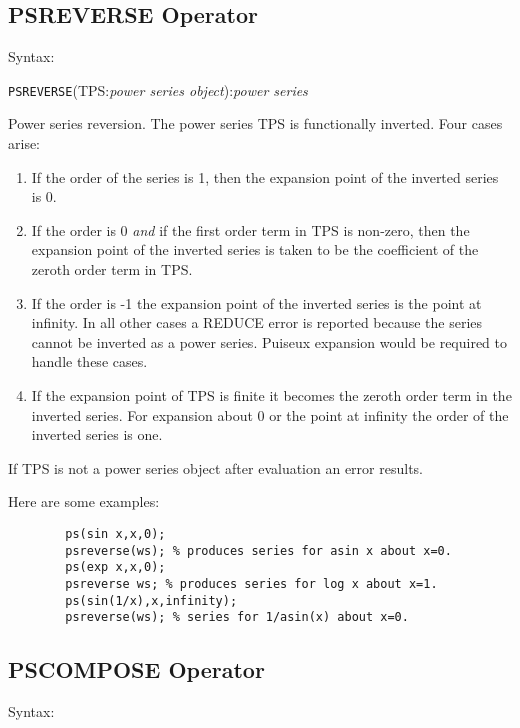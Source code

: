 \subsection{PSREVERSE Operator}

Syntax:

\hspace*{2em}
{\tt PSREVERSE}(TPS:{\em power series object}):{\em power series}

Power series reversion.  The power series TPS is functionally
inverted.  Four cases arise:

\begin{enumerate}
\item If the order of the series is 1, then the expansion point of the
inverted series is 0. 

\item If the order is 0 {\em and} if the first order term in TPS
is non-zero, then the expansion point of the inverted series is taken
to be the coefficient of the zeroth order term in TPS.

\item If the order is -1 the expansion point of the inverted series
is the point at infinity.  In all other cases a REDUCE error is
reported because the series cannot be inverted as a power series.
Puiseux  expansion would be required to
handle these cases. 

\item If the expansion point of TPS is finite it becomes the
zeroth order term in the inverted series. For expansion about 0 or the
point at infinity the order of the inverted series is one.
\end{enumerate}

If TPS is not a power series object after evaluation an error results.

\noindent Here are some examples:
\begin{verbatim}
        ps(sin x,x,0);
        psreverse(ws); % produces series for asin x about x=0.
        ps(exp x,x,0);
        psreverse ws; % produces series for log x about x=1.
        ps(sin(1/x),x,infinity);
        psreverse(ws); % series for 1/asin(x) about x=0.
\end{verbatim}

\subsection{PSCOMPOSE Operator}

Syntax:

